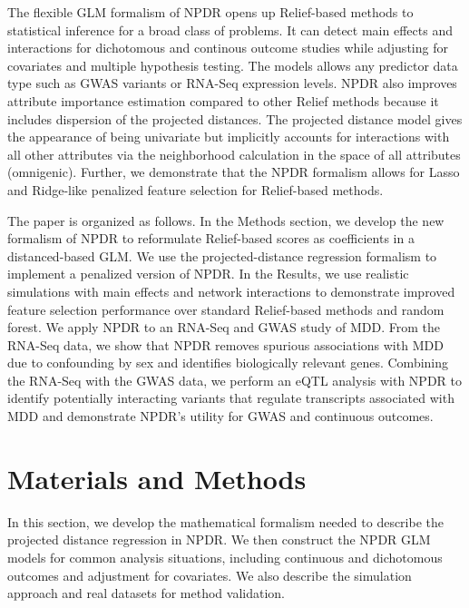 \documentclass[10pt]{article}
\begin{document}
The flexible GLM formalism of NPDR opens up Relief-based methods to statistical inference for a broad class of problems.
It can detect main effects and interactions for dichotomous and continous outcome studies while adjusting for covariates and multiple hypothesis testing. The models allows any predictor data type such as GWAS variants or RNA-Seq expression levels. NPDR also improves attribute importance estimation compared to other Relief methods because it includes dispersion of the projected distances. The projected distance model gives the appearance of being univariate but implicitly accounts for interactions with all other attributes via the neighborhood calculation in the space of all attributes (omnigenic). Further, we demonstrate that the NPDR formalism allows for Lasso and Ridge-like penalized feature selection for Relief-based methods.

The paper is organized as follows.
In the Methods section, we develop the new formalism of NPDR to reformulate Relief-based scores as coefficients in a distanced-based GLM.
We use the projected-distance regression formalism to implement a penalized version of NPDR. 
In the Results, we use realistic simulations with main effects and network interactions to demonstrate improved feature selection performance over standard Relief-based methods and random forest. 
We apply NPDR to an RNA-Seq and GWAS study of MDD.
From the RNA-Seq data, we show that NPDR removes spurious associations with MDD due to confounding by sex and identifies biologically relevant genes. Combining the RNA-Seq with the GWAS data, we perform an eQTL analysis with NPDR to identify potentially interacting variants that regulate transcripts associated with MDD and demonstrate NPDR's utility for GWAS and continuous outcomes.



\section{Materials and Methods}
In this section, we develop the mathematical formalism needed to describe the projected distance regression in NPDR. We then construct the NPDR GLM models for common analysis situations, including continuous and dichotomous outcomes and adjustment for covariates. We also describe the simulation approach and real datasets for method validation. 
\end{document}

